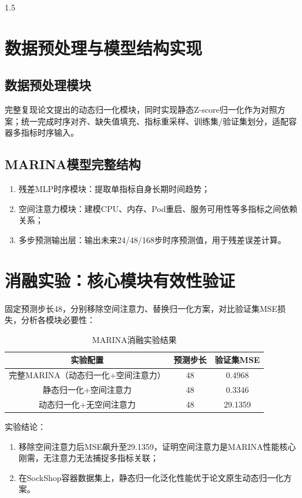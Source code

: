 \documentclass[a4paper,12pt]{report}
\begin{document}
\begin{spacing}{1.5}
\section{数据预处理与模型结构实现}
\subsection{数据预处理模块}
完整复现论文提出的动态归一化模块，同时实现静态Z-score归一化作为对照方案；统一完成时序对齐、缺失值填充、指标重采样、训练集/验证集划分，适配容器多指标时序输入。

\subsection{MARINA模型完整结构}
\begin{enumerate}
    \item 残差MLP时序模块：提取单指标自身长期时间趋势；
    \item 空间注意力模块：建模CPU、内存、Pod重启、服务可用性等多指标之间依赖关系；
    \item 多步预测输出层：输出未来24/48/168步时序预测值，用于残差误差计算。
\end{enumerate}

\section{消融实验：核心模块有效性验证}
固定预测步长48，分别移除空间注意力、替换归一化方案，对比验证集MSE损失，分析各模块必要性：
\begin{table}[htbp]
\centering
\caption{MARINA消融实验结果}
\begin{tabular}{ccc}
\toprule
\textbf{实验配置} & \textbf{预测步长} & \textbf{验证集MSE} \\
\midrule
完整MARINA（动态归一化+空间注意力） & 48 & 0.4968 \\
静态归一化+空间注意力 & 48 & 0.3346 \\
动态归一化+无空间注意力 & 48 & 29.1359 \\
\bottomrule
\end{tabular}
\end{table}

实验结论：
\begin{enumerate}
    \item 移除空间注意力后MSE飙升至29.1359，证明空间注意力是MARINA性能核心刚需，无注意力无法捕捉多指标关联；
    \item 在SockShop容器数据集上，静态归一化泛化性能优于论文原生动态归一化方案。
\end{enumerate}


\end{spacing}
\end{document}
